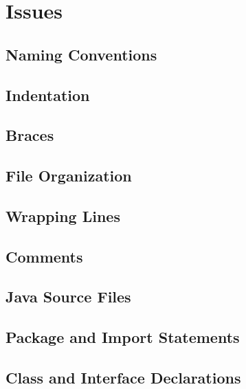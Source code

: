 \section{Issues}
\subsection{Naming Conventions}
	


\subsection{Indentation}
	


\subsection{Braces}
	


\subsection{File Organization}
	


\subsection{Wrapping Lines}
	


\subsection{Comments}
	


\subsection{Java Source Files}
	


\subsection{Package and Import Statements}
	


\subsection{Class and Interface Declarations}
	


